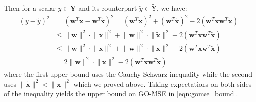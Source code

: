 \documentclass{article}
\theoremstyle{plain}
\begin{document}
Then for a scalar $y\in\mathbf{Y}$ and its counterpart $\tilde{y}\in\tilde{\mathbf{Y}}$, we have:
\begin{align*}
    \left(y-\tilde{y}\right)^2&=\left(\mathbf{w}^T\mathbf{x}-\mathbf{w}^T\tilde{\mathbf{x}}\right)^2 = \left(\mathbf{w}^T\mathbf{x}\right)^2+\left(\mathbf{w}^T\tilde{\mathbf{x}}\right)^2 -2\left(\mathbf{w}^T\mathbf{x}\mathbf{w}^T\tilde{\mathbf{x}}\right)\\
    ~&\leq \lVert \mathbf{w}\rVert^2\cdot\lVert\mathbf{x} \rVert^2 + \lVert \mathbf{w}\rVert^2\cdot\lVert\tilde{\mathbf{x}} \rVert^2 -2\left(\mathbf{w}^T\mathbf{x}\mathbf{w}^T\tilde{\mathbf{x}}\right) \\
    ~&\leq \lVert \mathbf{w}\rVert^2\cdot\lVert\mathbf{x} \rVert^2 + \lVert \mathbf{w}\rVert^2\cdot\lVert\mathbf{x} \rVert^2-2\left(\mathbf{w}^T\mathbf{x}\mathbf{w}^T\tilde{\mathbf{x}}\right)\\
    &=2\lVert \mathbf{w}\rVert^2\cdot\lVert\mathbf{x} \rVert^2-2\left(\mathbf{w}^T\mathbf{x}\mathbf{w}^T\tilde{\mathbf{x}}\right)
\end{align*}
where the first upper bound uses the Cauchy-Schwarz inequality while the second uses $\lVert \tilde{\mathbf{x}} \rVert^2<\lVert \mathbf{x} \rVert^2$ which we proved above. Taking expectations on both sides of the inequality yields the upper bound on GO-MSE in \eqref{eqn:gomse_bound}.
\end{document}
